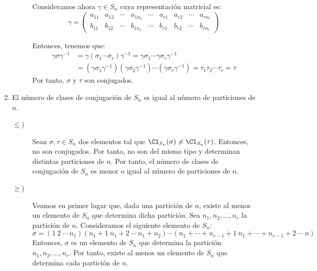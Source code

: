 \begin{ejercicio}
\begin{enumerate}
\begin{description}
            Consideramos ahora $\gamma\in S_n$ cuya representación matricial es:
            \begin{equation*}
                \gamma = \begin{pmatrix}
                    a_{11} & a_{12} & \cdots & a_{1n_1} & \cdots & a_{r1} & a_{r2} & \cdots & a_{rn_r}\\
                    b_{11} & b_{12} & \cdots & b_{1n_1} & \cdots & b_{r1} & b_{r2} & \cdots & b_{rn_r}
                \end{pmatrix}
            \end{equation*}

            Entonces, tenemos que:
            \begin{align*}
                \gamma\sigma\gamma^{-1} &= \gamma(\sigma_1\cdots\sigma_r)\gamma^{-1} = \gamma\sigma_1\cdots\gamma\sigma_r\gamma^{-1}\\
                &= (\gamma\sigma_1\gamma^{-1})(\gamma\sigma_2\gamma^{-1})\cdots(\gamma\sigma_r\gamma^{-1}) = \tau_1\tau_2\cdots\tau_r = \tau
            \end{align*}
            Por tanto, $\sigma$ y $\tau$ son conjugados.
        \end{description}

        \item El número de clases de conjugación de $S_n$ es igual al número de particiones de $n$.
        
        \begin{description}
            \item[$\leq$)] Sean $\sigma,\tau\in S_n$ dos elementos tal que $\Cl_{S_n}(\sigma)\neq \Cl_{S_n}(\tau)$. Entonces, no son conjugados. Por tanto, no son del mismo tipo y determinan distintas particiones de $n$. Por tanto, el número de clases de conjugación de $S_n$ es menor o igual al número de particiones de $n$.
            
            \item[$\geq$)] Veamos en primer lugar que, dada una partición de $n$, existe al menos un elemento de $S_n$ que determina dicha partición. Sea $n_1, n_2, \ldots, n_r$ la partición de $n$. Consideramos el siguiente elemento de $S_n$:
            \begin{equation*}
                \sigma = (1\ 2\ \cdots\ n_1)(n_1+1\ n_1+2\ \cdots\ n_1+n_2)\cdots(n_1+\cdots+n_{r-1}+1\ n_1+\cdots+n_{r-1}+2\ \cdots\ n)
            \end{equation*}
            Entonces, $\sigma$ es un elemento de $S_n$ que determina la partición $n_1, n_2, \ldots, n_r$. Por tanto, existe al menos un elemento de $S_n$ que determina cada partición de $n$.


\end{description}
\end{enumerate}
\end{ejercicio}
